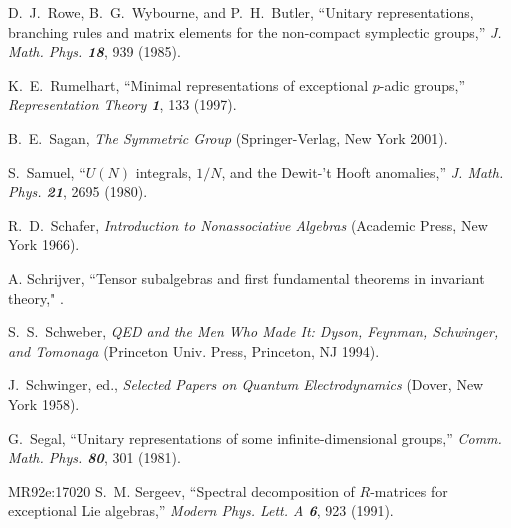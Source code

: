  D.~J.~Rowe, B.~G.~Wybourne, and P.~H.~Butler,
    ``Unitary representations, branching rules and matrix elements
      for the non-compact symplectic groups,''
    {\em J. Math. Phys. \bf 18}, 939 (1985). %

 K.~E.~Rumelhart, %
    ``Minimal representations of exceptional $p$-adic groups,''
    {\em Representation Theory \bf 1}, 133 (1997). %


 B.~E.~Sagan,
     {\em The Symmetric Group}
    (Springer-Verlag, New York 2001).

S.~Samuel,
``$U(N)$ integrals, $1/N$, and the Dewit-'t Hooft anomalies,''
{\em J.  Math.  Phys.    \bf 21}, 2695 (1980).

 R.~D.~Schafer,
{\em Introduction to Nonassociative Algebras}
(Academic Press, New York 1966).

 A. Schrijver,
    ``Tensor subalgebras and first fundamental theorems in invariant theory,"
    .



 S.~S.~Schweber,
    {\em QED and the Men Who Made It:
         Dyson, Feynman, Schwinger, and Tomonaga}
    (Princeton Univ. Press, Princeton, NJ 1994).

 J.~Schwinger, ed.,
    {\em Selected Papers on Quantum Electrodynamics}
        (Dover, New York 1958).

 G.\  Segal,
    ``Unitary representations of some infinite-dimensional groups,''
    {\em Comm. Math. Phys. \bf 80}, 301 (1981).

        {MR92e:17020}
S.~M. Sergeev,
``Spectral decomposition of $R$-matrices for
  exceptional Lie algebras,''
{\em Modern Phys. Lett. A  \bf 6}, 923 (1991). %


